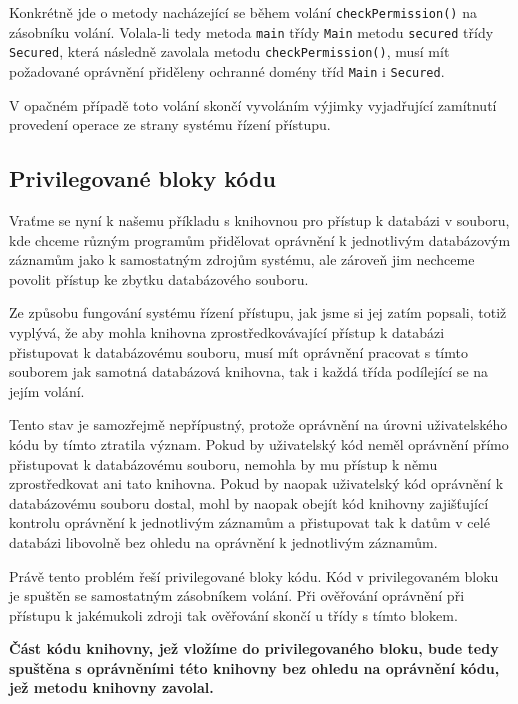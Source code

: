 Konkrétně jde o metody nacházející se během volání {\tt checkPermission()} na zásobníku volání. Volala-li tedy metoda {\tt main} třídy {\tt Main} metodu {\tt secured} třídy {\tt Secured}, která následně zavolala metodu {\tt checkPermission()}, musí mít požadované oprávnění přiděleny ochranné domény tříd {\tt Main} i {\tt Secured}.

V opačném případě toto volání skončí vyvoláním výjimky vyjadřující zamítnutí provedení operace ze strany systému řízení přístupu. \cite[5.5]{oaks}\cite[6.1]{oaks}

\subsection{Privilegované bloky kódu}\label{privilegovaneBloky}

Vraťme se nyní k našemu příkladu s knihovnou pro přístup k databázi v souboru, kde chceme různým programům přidělovat oprávnění k jednotlivým databázovým záznamům jako k samostatným zdrojům systému, ale zároveň jim nechceme povolit přístup ke zbytku databázového souboru.

Ze způsobu fungování systému řízení přístupu, jak jsme si jej zatím popsali, totiž vyplývá, že aby mohla knihovna zprostředkovávající přístup k databázi přistupovat k databázovému souboru, musí mít oprávnění pracovat s tímto souborem jak samotná databázová knihovna, tak i každá třída podílející se na jejím volání.

Tento stav je samozřejmě nepřípustný, protože oprávnění na úrovni uživatelského kódu by tímto ztratila význam. Pokud by uživatelský kód neměl oprávnění přímo přistupovat k databázovému souboru, nemohla by mu přístup k němu zprostředkovat ani tato knihovna. Pokud by naopak uživatelský kód oprávnění k databázovému souboru dostal, mohl by naopak obejít kód knihovny zajišťující kontrolu oprávnění k jednotlivým záznamům a přistupovat tak k datům v celé databázi libovolně bez ohledu na oprávnění k jednotlivým záznamům.

Právě tento problém řeší privilegované bloky kódu. Kód v privilegovaném bloku je spuštěn se samostatným zásobníkem volání. Při ověřování oprávnění při přístupu k jakémukoli zdroji tak ověřování skončí u třídy s tímto blokem. \cite{refAccessController}

{\bf Část kódu knihovny, jež vložíme do privilegovaného bloku, bude tedy spuštěna s oprávněními této knihovny bez ohledu na oprávnění kódu, jež metodu knihovny zavolal.}

